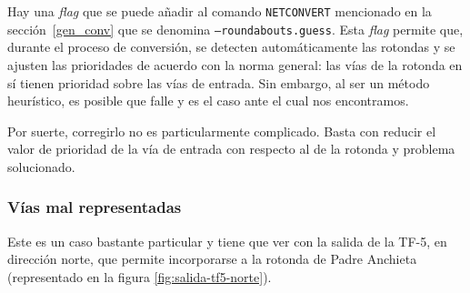 Hay una \textit{flag} que se puede añadir al comando \texttt{NETCONVERT} mencionado en la sección~\ref{gen_conv} que se denomina \texttt{--roundabouts.guess}. Esta \textit{flag} permite que, durante el proceso de conversión, se detecten automáticamente las rotondas y se ajusten las prioridades de acuerdo con la norma general: las vías de la rotonda en sí tienen prioridad sobre las vías de entrada. Sin embargo, al ser un método heurístico, es posible que falle y es el caso ante el cual nos encontramos.

Por suerte, corregirlo no es particularmente complicado. Basta con reducir el valor de prioridad de la vía de entrada con respecto al de la rotonda y problema solucionado.

\subsubsection{Vías mal representadas}

Este es un caso bastante particular y tiene que ver con la salida de la TF-5, en dirección norte, que permite incorporarse a la rotonda de Padre Anchieta (representado en la figura \ref{fig:salida-tf5-norte}). 


